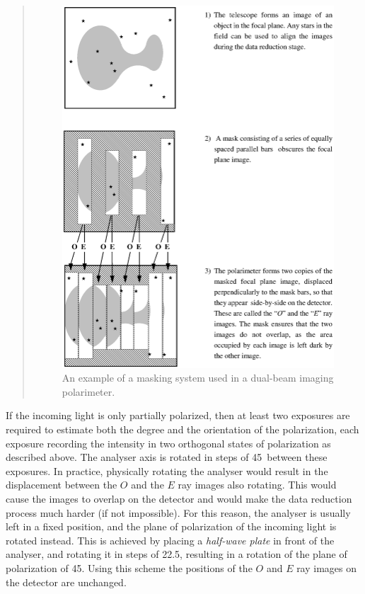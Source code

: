 \begin{htmlonly}
   \begin{quote}
   \begin{figure}[hbtp]
   \label{fig:grids}
   \includegraphics[scale=0.5,width=8in]{sun223_figures/grids.eps}
   \caption{An example of a masking system used in a dual-beam imaging polarimeter.}
   \end{figure}
   \end{quote}
\end{htmlonly}

If the incoming light is only partially polarized, then at least two
exposures are required to estimate both the degree and the orientation of
the polarization, each exposure recording the intensity in two orthogonal
states of polarization as described above. The analyser axis is rotated
in steps of 45\dgs\ between these exposures. In practice, physically rotating
the analyser would result in the displacement between the $O$ and
the $E$ ray images also rotating. This would cause the images to overlap
on the detector and would make the data reduction process much harder (if
not impossible). For this reason, the analyser is usually left in a fixed
position, and the plane of polarization of the incoming light is rotated
instead. This is achieved by placing a {\em half-wave plate} in
front of the analyser, and rotating it in steps of 22.5\dgs, resulting in
a rotation of the plane of polarization of 45\dgs. Using this scheme the
positions of the $O$ and $E$ ray images on the detector are unchanged.

